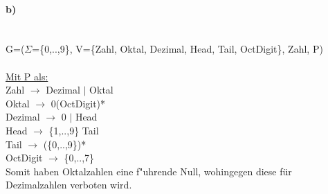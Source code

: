 \documentclass[12pt]{article}
\begin{document}
\paragraph{b)}\ \\
	G=($\Sigma$=\{0,..,9\}, V=\{Zahl, Oktal, Dezimal, Head, Tail, OctDigit\}, Zahl, P)\\
	\ \\
	\noindent \underline{Mit P als:}\\
	Zahl $\rightarrow$ Dezimal $|$ Oktal\\
	Oktal $\rightarrow$ 0(OctDigit)*\\
	Dezimal $\rightarrow$ 0 $|$ Head\\
	Head $\rightarrow$ \{1,..,9\} Tail\\
	Tail $\rightarrow$ (\{0,..,9\})*\\
	OctDigit $\rightarrow$ \{0,..,7\}\\	
	
	\noindent Somit haben Oktalzahlen eine f"uhrende Null, wohingegen diese f\"ur Dezimalzahlen verboten wird.
	
\end{document}
